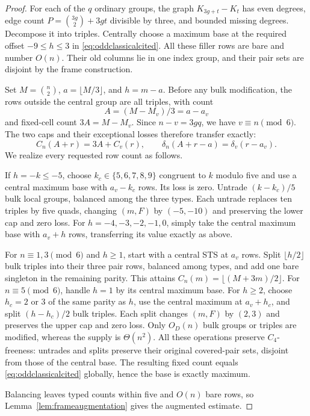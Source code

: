 \documentclass[11pt]{article}
\begin{document}
\begin{proof}
For each of the $q$ ordinary groups, the graph $K_{3g+t}-K_t$ has even
degrees, edge count $P=\binom{3g}{2}+3gt$ divisible by three, and bounded
missing degrees. Decompose it into triples. Centrally choose a maximum
base at the required offset $-9\le h\le3$ in
\eqref{eq:oddclassicalcited}. All these filler rows are bare and number
$O(n)$. Their old columns lie in one index group, and their pair sets
are disjoint by the frame construction.

Set $M=\binom n2$, $a=\lfloor M/3\rfloor$, and $h=m-a$.
Before any bulk modification, the rows outside the central group are
all triples, with count
\[
 A=(M-M_v)/3=a-a_v
\]
and fixed-cell count $3A=M-M_v$. Since $n-v=3gq$, we have $v\equiv n\pmod6$.
The two caps and their exceptional losses therefore transfer exactly:
\[
 C_n(A+r)=3A+C_v(r),\qquad
 \delta_n(A+r-a)=\delta_v(r-a_v).
\]
We realize every requested row count as follows.

If $h=-k\le-5$, choose $k_c\in\{5,6,7,8,9\}$ congruent to $k$
modulo five and use a central maximum base with $a_v-k_c$ rows.
Its loss is zero. Untrade $(k-k_c)/5$ bulk local groups, balanced among
the three types. Each untrade replaces ten triples by five quads,
changing $(m,F)$ by $(-5,-10)$ and preserving the lower cap and zero
loss. For $h=-4,-3,-2,-1,0$, simply take the central maximum base with
$a_v+h$ rows, transferring its value exactly as above.

For $n\equiv1,3\pmod6$ and $h\ge1$, start with a central STS at
$a_v$ rows. Split $\lfloor h/2\rfloor$ bulk triples into their three
pair rows, balanced among types, and add one bare singleton in the remaining
parity. This attains $C_n(m)=\lfloor(M+3m)/2\rfloor$.
For $n\equiv5\pmod6$, handle $h=1$ by its central maximum base.
For $h\ge2$, choose $h_c=2$ or $3$ of the same parity as $h$, use the
central maximum at $a_v+h_c$, and split $(h-h_c)/2$ bulk triples.
Each split changes $(m,F)$ by $(2,3)$ and preserves the upper cap and
zero loss. Only $O_D(n)$ bulk groups or triples are modified, whereas
the supply is $\Theta(n^2)$. All these operations preserve $C_4$-freeness:
untrades and splits preserve their original covered-pair sets, disjoint
from those of the central base. The resulting fixed count equals
\eqref{eq:oddclassicalcited} globally, hence the base is exactly maximum.

Balancing leaves typed counts within five and $O(n)$ bare rows,
so Lemma~\ref{lem:frameaugmentation} gives the augmented estimate.
\end{proof}
\end{document}
